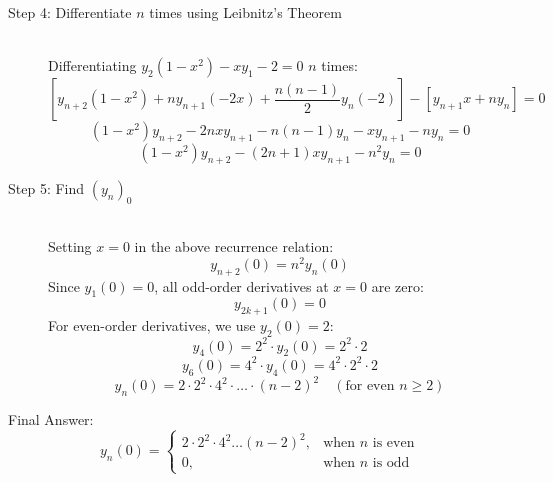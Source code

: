 \documentclass[11pt, a4paper]{article}
\begin{document}
\begin{description}
    \item[Step 4: Differentiate $n$ times using Leibnitz's Theorem] \ \\
    Differentiating $y_2(1-x^2) - xy_1 - 2 = 0$ $n$ times:
    \[ \left[ y_{n+2}(1-x^2) + n y_{n+1}(-2x) + \frac{n(n-1)}{2} y_n (-2) \right] - \left[ y_{n+1}x + n y_n \right] = 0 \]
    \[ (1-x^2)y_{n+2} - 2nxy_{n+1} - n(n-1)y_n - x y_{n+1} - n y_n = 0 \]
    \[ (1-x^2)y_{n+2} - (2n+1)xy_{n+1} - n^2 y_n = 0 \]

    \item[Step 5: Find $(y_n)_0$] \ \\
    Setting $x=0$ in the above recurrence relation:
    \[ y_{n+2}(0) = n^2 y_n(0) \]
    Since $y_1(0) = 0$, all odd-order derivatives at $x=0$ are zero:
    \[ y_{2k+1}(0) = 0 \]
    For even-order derivatives, we use $y_2(0) = 2$:
    \[ y_4(0) = 2^2 \cdot y_2(0) = 2^2 \cdot 2 \]
    \[ y_6(0) = 4^2 \cdot y_4(0) = 4^2 \cdot 2^2 \cdot 2 \]
    \[ y_n(0) = 2 \cdot 2^2 \cdot 4^2 \cdot \dots \cdot (n-2)^2 \quad (\text{for even } n \ge 2) \]
\end{description}

Final Answer:
\[ 
\boxed{
y_n(0) = \begin{cases} 
2 \cdot 2^2 \cdot 4^2 \dots (n-2)^2, & \text{when } n \text{ is even} \\ 
0, & \text{when } n \text{ is odd} 
\end{cases}
} 
\]

\end{document}
